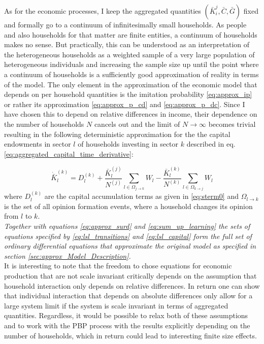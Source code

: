 As for the economic processes, I keep the aggregated quantities $(\bar{K}_i^j, \bar{C}, \bar{G})$ fixed and formally go to a continuum of infinitesimally small households. As people and also households for that matter are finite entities, a continuum of households makes no sense. But practically, this can be understood as an interpretation of the heterogeneous households as a weighted sample of a very large population of heterogeneous individuals and increasing the sample size up until the point where a continuum of households is a sufficiently good approximation of reality in terms of the model. 
The only element in the approximation of the economic model that depends on per household quantities is the imitation probability \eqref{eq:approx_ip} or rather its approximation \eqref{eq:approx_p_cd} and \eqref{eq:approx_p_dc}. Since I have chosen this to depend on relative differences in income, their dependence on the number of households $N$ cancels out and the limit of $N \rightarrow \infty$ becomes trivial resulting in the following deterministic approximation for the the capital endowments in sector $l$ of households investing in sector $k$ described in eq. \eqref{eq:aggregated_capital_time_derivative}:

\begin{equation}
  \dot{\bar{K}}_l^{(k)} = D_l^{(k)} + \frac{\bar{K}_l^{(j)}}{N^{(j)}}\sum_{l \in \Omega_{j \rightarrow k}}W_l - \frac{\bar{K}_l^{(k)}}{N^{(k)}}\sum_{l \in \Omega_{k \rightarrow j}}W_l
  \label{eq:lsl_capital}
\end{equation}
where $D_l^{(k)}$ are the capital accumulation terms as given in \eqref{eq:sterm0} and $\Omega_{l \rightarrow k}$ is the set of all opinion formation events, where a household changes its opinion from $l$ to $k$.\\

\textit{Together with equations \eqref{eq:approx_surd} and \eqref{eq:sum_up_learning} the sets of equations specified by \eqref{eq:lsl_transitions} and \eqref{eq:lsl_capital} form the full set of ordinary differential equations that approximate the original model as specified in section \ref{sec:approx_Model_Description}.}\\

It is interesting to note that the freedom to chose equations for economic production that are not scale invariant critically depends on the assumption that household interaction only depends on relative differences. In return one can show that individual interaction that depends on absolute differences only allow for a large system limit if the system is scale invariant in terms of aggregated quantities. Regardless, it would be possible to relax both of these assumptions and to work with the PBP process with the results explicitly depending on the number of households, which in return could lead to interesting finite size effects.


